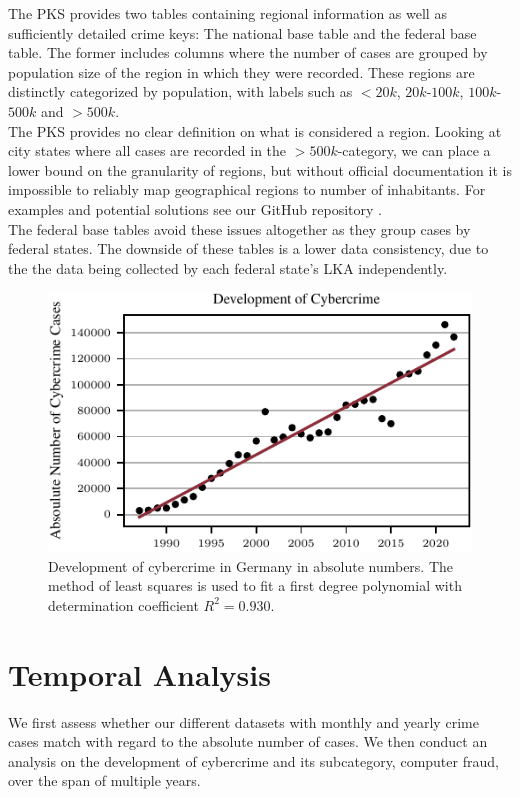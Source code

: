 \documentclass{article}
\theoremstyle{plain}
\theoremstyle{definition}
\theoremstyle{remark}
\begin{document}
The PKS provides two tables containing regional information as well as sufficiently detailed crime keys: The national base table and the federal base table.
The former includes columns where the number of cases are grouped by population size of the region in which they were recorded. 
These regions are distinctly categorized by population, with labels such as $<$$20k$, $20k$-$100k$, $100k$-$500k$ and $>$$500k$.\\
The PKS provides no clear definition on what is considered a region. Looking at city states where all cases are recorded in the $>$$500k$-category, we can place a lower bound on the granularity of regions, but without official documentation it is impossible to reliably map geographical regions to number of inhabitants. For examples and potential solutions see our GitHub repository \citep{GitHubSpatial}.\\
The federal base tables avoid these issues altogether as they group cases by federal states. The downside of these tables is a lower data consistency, due to the the data being collected by each federal state's LKA independently.

\begin{figure}
\includegraphics{fig/temporal_analysis_polynomial_fit.pdf}
    \caption{Development of cybercrime in Germany in absolute numbers. The method of least squares is used to fit a first degree polynomial with determination coefficient $R^2=0.930$.}
    \label{polynomial_plot}
\end{figure}
%
\section{Temporal Analysis}
\label{temp_analysis}
We first assess whether our different datasets with monthly and yearly crime cases match with regard to the absolute number of cases. We then conduct an analysis on the development of cybercrime and its subcategory, computer fraud, over the span of multiple years.
\end{document}
